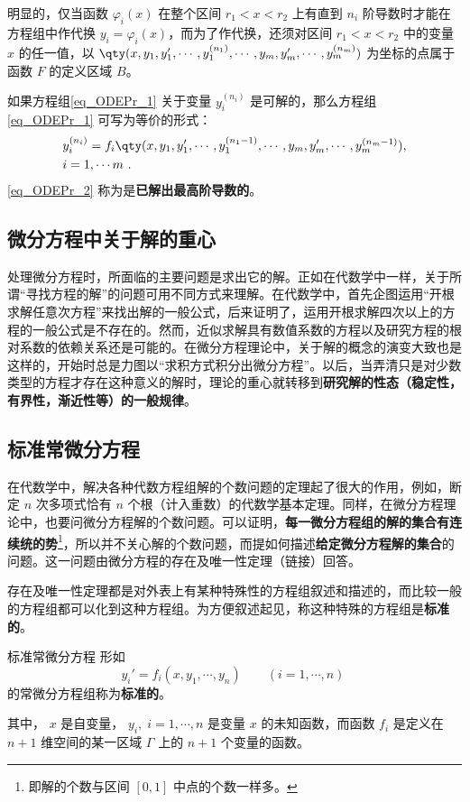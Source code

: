 明显的，仅当函数 $\varphi_i(x)$ 在整个区间 $r_1<x<r_2$ 上有直到 $n_i$ 阶导数时才能在方程组中作代换 $y_i=\varphi_i(x)$，而为了作代换，还须对区间 $r_1<x<r_2$ 中的变量 $x$ 的任一值，以 $\qty(x,y_1,y_1',\cdots,y_1^{(n_1)},\cdots,y_m,y_m',\cdots,y_m^{(n_m)})$ 为坐标的点属于函数 $F$ 的定义区域 $B$。

如果方程组\autoref{eq_ODEPr_1} 关于变量 $y_i^{(n_i)}$ 是可解的，那么方程组\autoref{eq_ODEPr_1} 可写为等价的形式： 
\begin{equation}\label{eq_ODEPr_2}
\begin{aligned}
&y_i^{(n_i)}=f_i\qty(x,y_1,y_1',\cdots,y_1^{(n_1-1)},\cdots,y_m,y_m',\cdots,y_m^{(n_m-1)}),\\
& i=1,\cdots m~.
\end{aligned}
\end{equation}
\autoref{eq_ODEPr_2} 称为是\textbf{已解出最高阶导数的}。
\subsection{微分方程中关于解的重心}
处理微分方程时，所面临的主要问题是求出它的解。正如在代数学中一样，关于所谓“寻找方程的解”的问题可用不同方式来理解。在代数学中，首先企图运用“开根求解任意次方程”来找出解的一般公式，后来证明了，运用开根求解四次以上的方程的一般公式是不存在的。然而，近似求解具有数值系数的方程以及研究方程的根对系数的依赖关系还是可能的。在微分方程理论中，关于解的概念的演变大致也是这样的，开始时总是力图以“求积方式积分出微分方程”。以后，当弄清只是对少数类型的方程才存在这种意义的解时，理论的重心就转移到\textbf{研究解的性态（稳定性，有界性，渐近性等）的一般规律}。
\subsection{标准常微分方程}\label{sub_ODEPr_1}
在代数学中，解决各种代数方程组解的个数问题的定理起了很大的作用，例如，断定 $n$ 次多项式恰有 $n$ 个根（计入重数）的代数学基本定理。同样，在微分方程理论中，也要问微分方程解的个数问题。可以证明，\textbf{每一微分方程组的解的集合有连续统的势}\footnote{即解的个数与区间 $[0,1]$ 中点的个数一样多。}，所以并不关心解的个数问题，而提如何描述\textbf{给定微分方程解的集合}的问题。这一问题由微分方程的存在及唯一性定理（链接）回答。

存在及唯一性定理都是对外表上有某种特殊性的方程组叙述和描述的，而比较一般的方程组都可以化到这种方程组。为方便叙述起见，称这种特殊的方程组是\textbf{标准的}。

\begin{definition}{标准常微分方程}\label{def_ODEPr_1}
形如
\begin{equation}\label{eq_ODEPr_7}
y_i'=f_i(x,y_1,\cdots,y_n)\qquad (i=1,\cdots,n)~
\end{equation}
的常微分方程组称为\textbf{标准的}。

其中， $x$ 是自变量， $y_i,\; i=1,\cdots, n$ 是变量 $x$ 的未知函数，而函数 $f_i$ 是定义在 $n+1$ 维空间的某一区域 $\Gamma$ 上的 $n+1$ 个变量的函数。
\end{definition}

